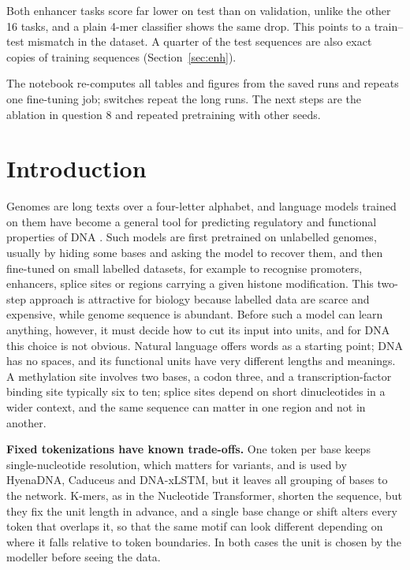 \documentclass{article}
\begin{document}
\begin{description}[leftmargin=0pt,itemsep=3pt,topsep=2pt]
  \item[9. Why are enhancers the weakest tasks?] Both enhancer tasks score far lower on test than on
  validation, unlike the other 16 tasks, and a plain 4-mer classifier shows the same drop. This points
  to a train--test mismatch in the dataset. A quarter of the test sequences are also exact copies of
  training sequences (Section~\ref{sec:enh}).

  \item[10. Can the results be reproduced, and what comes next?] The notebook re-computes all tables
  and figures from the saved runs and repeats one fine-tuning job; switches repeat the
  long runs. The next steps are the ablation in question 8 and repeated pretraining with other seeds.
\end{description}

\section{Introduction}\label{sec:intro}

Genomes are long texts over a four-letter alphabet, and language models trained on them have become
a general tool for predicting regulatory and functional properties of DNA
\citep{dallatorre2023nt,nguyen2023hyenadna,schiff2024caduceus}. Such models are first
pretrained on unlabelled genomes, usually by hiding some bases and asking the model to recover them,
and then fine-tuned on small labelled datasets, for example to recognise promoters, enhancers,
splice sites or regions carrying a given histone modification. This two-step approach is attractive
for biology because labelled data are scarce and expensive, while genome sequence is abundant.
Before such a model can learn anything, however, it must decide how to cut its input into units,
and for DNA this choice is not obvious.
Natural language offers words as a starting point; DNA has no spaces, and its functional units have
very different lengths and meanings. A methylation site involves two bases, a codon three, and a
transcription-factor binding site typically six to ten; splice sites depend on short dinucleotides
in a wider context, and the same sequence can matter in one region and not in another.

\textbf{Fixed tokenizations have known trade-offs.} One token per base keeps single-nucleotide
resolution, which matters for variants, and is used by HyenaDNA, Caduceus and DNA-xLSTM, but it leaves
all grouping of bases to the network. K-mers, as in the Nucleotide Transformer, shorten the sequence,
but they fix the unit length in advance, and a single base change or shift alters every token that
overlaps it, so that the same motif can look different depending on where it falls relative to token
boundaries. In both cases the unit is chosen by the modeller before seeing the data.
\end{document}
